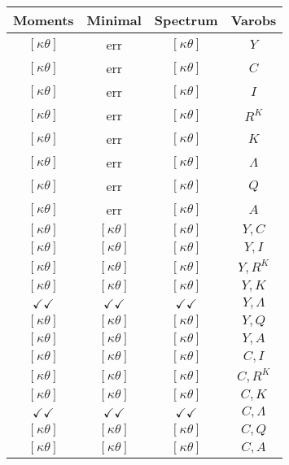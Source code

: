 \documentclass[a4paper,10pt]{article}
\begin{document}
\centering
\begin{longtable}{|c|c|c|c|}
\hline
Moments & Minimal & Spectrum & Varobs \\
\hline
$[\kappa \theta ]$ & err & $[\kappa \theta ]$ & ${Y}$ \\
\hline
$[\kappa \theta ]$ & err & $[\kappa \theta ]$ & ${C}$ \\
\hline
$[\kappa \theta ]$ & err & $[\kappa \theta ]$ & ${I}$ \\
\hline
$[\kappa \theta ]$ & err & $[\kappa \theta ]$ & ${R^{K}}$ \\
\hline
$[\kappa \theta ]$ & err & $[\kappa \theta ]$ & ${K}$ \\
\hline
$[\kappa \theta ]$ & err & $[\kappa \theta ]$ & ${\Lambda}$ \\
\hline
$[\kappa \theta ]$ & err & $[\kappa \theta ]$ & ${Q}$ \\
\hline
$[\kappa \theta ]$ & err & $[\kappa \theta ]$ & ${A}$ \\
\hline
$[\kappa \theta ]$ & $[\kappa \theta ]$ & $[\kappa \theta ]$ & ${Y},{C}$ \\
\hline
$[\kappa \theta ]$ & $[\kappa \theta ]$ & $[\kappa \theta ]$ & ${Y},{I}$ \\
\hline
$[\kappa \theta ]$ & $[\kappa \theta ]$ & $[\kappa \theta ]$ & ${Y},{R^{K}}$ \\
\hline
$[\kappa \theta ]$ & $[\kappa \theta ]$ & $[\kappa \theta ]$ & ${Y},{K}$ \\
\hline
$\checkmark\checkmark$ & $\checkmark\checkmark$ & $\checkmark\checkmark$ & ${Y},{\Lambda}$ \\
\hline
$[\kappa \theta ]$ & $[\kappa \theta ]$ & $[\kappa \theta ]$ & ${Y},{Q}$ \\
\hline
$[\kappa \theta ]$ & $[\kappa \theta ]$ & $[\kappa \theta ]$ & ${Y},{A}$ \\
\hline
$[\kappa \theta ]$ & $[\kappa \theta ]$ & $[\kappa \theta ]$ & ${C},{I}$ \\
\hline
$[\kappa \theta ]$ & $[\kappa \theta ]$ & $[\kappa \theta ]$ & ${C},{R^{K}}$ \\
\hline
$[\kappa \theta ]$ & $[\kappa \theta ]$ & $[\kappa \theta ]$ & ${C},{K}$ \\
\hline
$\checkmark\checkmark$ & $\checkmark\checkmark$ & $\checkmark\checkmark$ & ${C},{\Lambda}$ \\
\hline
$[\kappa \theta ]$ & $[\kappa \theta ]$ & $[\kappa \theta ]$ & ${C},{Q}$ \\
\hline
$[\kappa \theta ]$ & $[\kappa \theta ]$ & $[\kappa \theta ]$ & ${C},{A}$ \\

\end{longtable}
\end{document}
